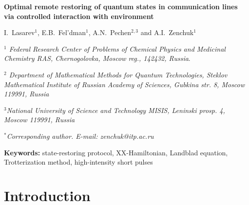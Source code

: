 \documentclass[pra,preprint,showpacs]{revtex4-1}
\begin{document}
\begin{center}
{\large \sc \bf {Optimal {{remote}} restoring of quantum states in communication lines via controlled interaction with environment}
}


\vskip 15pt

{\large
I.~Lasarev$^1$, E.B.~Fel'dman$^{1}$,  A.N.~Pechen$^{2,3}$ and  A.I.~Zenchuk$^{1}$
}

\vskip 8pt

{\it $^1$
Federal Research Center of Problems of Chemical Physics and Medicinal Chemistry RAS,
Chernogolovka, Moscow reg., 142432, Russia}.

{\it $^2$ Department of Mathematical Methods for Quantum Technologies, Steklov Mathematical Institute of Russian Academy of Sciences, Gubkina str. 8, Moscow 119991, Russia}

{\it $^3$National University of Science and Technology MISIS, Leninski prosp. 4, Moscow 119991, Russia}

{\it $^*$Corresponding author. E-mail:  zenchuk@itp.ac.ru}
\vskip 8pt

\end{center}
\date{\today}

\begin{abstract}

\end{abstract}

{\bf Keywords:} state-restoring protocol, XX-Hamiltonian, Landblad equation,  Trotterization method, high-intensity short pulses

\maketitle

\iffalse
\section{Introduction}
\label{Section:introduxtion}
\end{document}
